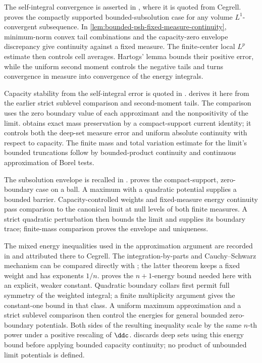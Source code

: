 The self-integral convergence is asserted in \cite[Theorem 2.2(3), p.~5]{Din07MixedV1}, where it is quoted from Cegrell.  proves the compactly supported bounded-subsolution case for any volume $L^1$-convergent subsequence. In \cref{lem:bounded-psh-fixed-measure-continuity}, minimum-norm convex tail combinations and the capacity-zero envelope discrepancy give continuity against a fixed measure. The finite-center local $L^p$ estimate then controls cell averages. Hartogs' lemma bounds their positive error, while the uniform second moment controls the negative tails and turns convergence in measure into convergence of the energy integrals.

Capacity stability from the self-integral error is quoted in \cite[Theorem 2.3, p.~5]{Din07MixedV1}.  derives it here from the earlier strict sublevel comparison and second-moment tails. The comparison uses the zero boundary value of each approximant and the nonpositivity of the limit.  obtains exact mass preservation by a compact-support current identity; it controls both the deep-set measure error and uniform absolute continuity with respect to capacity. The finite mass and total variation estimate for the limit's bounded truncations follow by bounded-product continuity and continuous approximation of Borel tests.

The subsolution envelope is recalled in \cite[Definition 2.4 and the following paragraph, p.~5]{Din07MixedV1}.  proves the compact-support, zero-boundary case on a ball. A maximum with a quadratic potential supplies a bounded barrier. Capacity-controlled weights and fixed-measure energy continuity pass comparison to the canonical limit at null levels of both finite measures. A strict quadratic perturbation then bounds the limit and supplies its boundary trace; finite-mass comparison proves the envelope and uniqueness.

The mixed energy inequalities used in the approximation argument are recorded in \cite[Section 2, p.~4]{Din07MixedV1} and attributed there to Cegrell. The integration-by-parts and Cauchy--Schwarz mechanism can be compared directly with \cite[Lemma 5.4 and Theorem 5.5, pp.~168--170]{Ceg04}; the latter theorem keeps a fixed weight and has exponents $1/n$.  proves the $n+1$-energy bound needed here with an explicit, weaker constant. Quadratic boundary collars first permit full symmetry of the weighted integral; a finite multiplicity argument gives the constant-one bound in that class. A uniform maximum approximation and a strict sublevel comparison then control the energies for general bounded zero-boundary potentials. Both sides of the resulting inequality scale by the same $n$-th power under a positive rescaling of $\ddc$.  discards deep sets using this energy bound before applying bounded capacity continuity; no product of unbounded limit potentials is defined.

